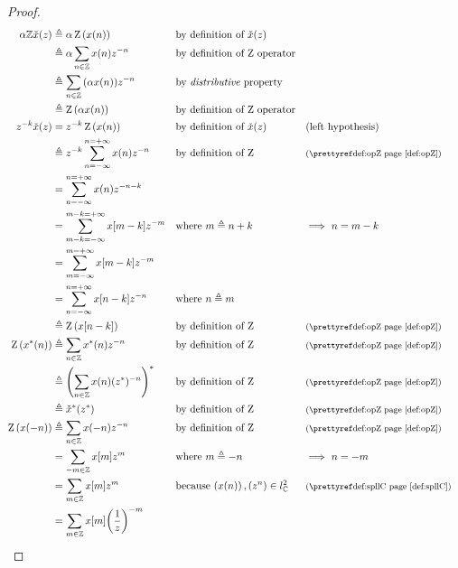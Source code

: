 \begin{proof}
\begin{align*}
  \alpha\Z\Zx(z)
    &\eqd \alpha \opZ \seqn{\fx(n)}                && \text{by definition of $\Zx(z)$}
  \\&\eqd \alpha \sum_{n\in\Z} \fx(n) z^{-n}       && \text{by definition of $\opZ$ operator}
  \\&\eqd \sum_{n\in\Z} \brp{\alpha\fx(n)} z^{-n}  && \text{by \prope{distributive} property}
  \\&\eqd \opZ\seqn{\alpha\fx(n)}                  && \text{by definition of $\opZ$ operator}
  \\
  z^{-k}\Zx(z)
    &= z^{-k} \opZ\seqn{\fx(n)}
    && \text{by definition of $\Zx(z)$}
    && \text{(left hypothesis)}
  \\&\eqd z^{-k}\sum_{n=-\infty}^{n=+\infty} \fx(n) z^{-n}
    && \text{by definition of $\opZ$}
    && \text{\xref{def:opZ}}
  \\&=          \sum_{n=-\infty}^{n=+\infty} \fx(n) z^{-n-k}
  \\&=          \sum_{m-k=-\infty}^{m-k=+\infty} \fx[m-k] z^{-m}
    && \text{where $m\eqd n+k$}
    && \text{$\implies$ $n=m-k$}
  \\&=          \sum_{m=-\infty}^{m=+\infty} \fx[m-k] z^{-m}
  \\&=          \sum_{n=-\infty}^{n=+\infty} \fx[n-k] z^{-n}
    && \text{where $n\eqd m$}
  \\&\eqd \opZ\seqn{\fx[n-k]}
    && \text{by definition of $\opZ$}
    && \text{\xref{def:opZ}}
  \\
  \opZ\seqn{\fx^\ast(n)}
    &\eqd \sum_{n\in\Z}\fx^\ast(n) z^{-n}
    && \text{by definition of $\opZ$}
    && \text{\xref{def:opZ}}
  \\&\eqd \brp{\sum_{n\in\Z}\fx(n) (z^\ast)^{-n}}^\ast
    && \text{by definition of $\opZ$}
    && \text{\xref{def:opZ}}
  \\&\eqd \Zx^\ast(z^\ast)
    && \text{by definition of $\opZ$}
    && \text{\xref{def:opZ}}
  \\
  \opZ\seqn{\fx(-n)}
    &\eqd \sum_{n\in\Z}\fx(-n) z^{-n}
    && \text{by definition of $\opZ$}
    && \text{\xref{def:opZ}}
  \\&= \sum_{-m\in\Z}\fx[m] z^{m}
    && \text{where $m\eqd -n$}
    && \text{$\implies$ $n=-m$}
  \\&= \sum_{m\in\Z}\fx[m] z^{m}
    && \text{because $\seqn{\fx(n)},\seqn{z^n}\in\spllC$}     && \text{\xref{def:spllC}}
  \\&= \sum_{m\in\Z}\fx[m] \brp{\frac{1}{z}}^{-m}

\end{align*}
\end{proof}
